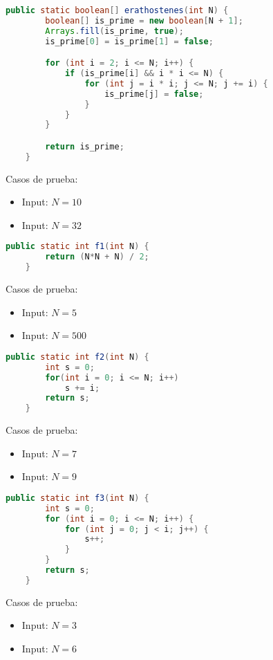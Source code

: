 \documentclass[12pt]{article}
\begin{document}
\begin{lstlisting}[language=Java]
    public static boolean[] erathostenes(int N) {
        boolean[] is_prime = new boolean[N + 1];
        Arrays.fill(is_prime, true);
        is_prime[0] = is_prime[1] = false;

        for (int i = 2; i <= N; i++) {
            if (is_prime[i] && i * i <= N) {
                for (int j = i * i; j <= N; j += i) {
                    is_prime[j] = false;
                }
            }
        }

        return is_prime;
    }
\end{lstlisting}
Casos de prueba:
\begin{itemize}
    \item Input: $N = 10$
    \item Input: $N = 32$
\end{itemize}

\begin{lstlisting}[language=Java]
    public static int f1(int N) {
        return (N*N + N) / 2;
    }
\end{lstlisting}
Casos de prueba:
\begin{itemize}
    \item Input: $N = 5$
    \item Input: $N = 500$
\end{itemize}
\newpage
{}
\begin{lstlisting}[language=Java]
    public static int f2(int N) {
        int s = 0;
        for(int i = 0; i <= N; i++)
            s += i;
        return s;
    }
\end{lstlisting}
Casos de prueba:
\begin{itemize}
    \item Input: $N = 7$
    \item Input: $N = 9$
\end{itemize}

\begin{lstlisting}[language=Java]
    public static int f3(int N) {
        int s = 0;
        for (int i = 0; i <= N; i++) {
            for (int j = 0; j < i; j++) {
                s++;
            }
        }
        return s;
    }
\end{lstlisting}
Casos de prueba:
\begin{itemize}
    \item Input: $N = 3$
    \item Input: $N = 6$
\end{itemize}
\end{document}
